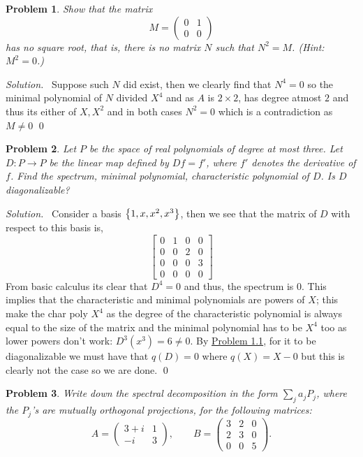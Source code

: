 \documentclass[12pt,a4paper]{article}
\newenvironment{solution}{%
  \par\noindent\textit{Solution.}\ }{\qed}
\theoremstyle{problemstyle}
\newtheorem{problem}{Problem}[section]
\begin{document}
\begin{problem}\label{prob:5-3}
Show that the matrix
\[
  M = \begin{pmatrix} 0 & 1 \\ 0 & 0 \end{pmatrix}
\]
has no square root, that is, there is no matrix $N$ such that $N^2 = M$. (Hint: $M^2 = 0$.)
\end{problem}
\begin{solution}
Suppose such $N$ did exist, then we clearly find that $N^4=0$ so the minimal polynomial of $N$ divided $X^4$ and as $A$ is $2\times 2$, has degree atmost $2$ and thus its either of $X,X^2$ and in both cases $N^2=0$ which is a contradiction as $M\neq 0$
\end{solution}
\begin{problem}\label{prob:5-4}
Let $P$ be the space of real polynomials of degree at most three. Let $D : P \to P$ be the linear map defined by $Df = f'$, where $f'$ denotes the derivative of $f$. Find the spectrum, minimal polynomial, characteristic polynomial of $D$. Is $D$ diagonalizable?
\end{problem}
\begin{solution}
Consider a basis $ \qty{1,x,x^2,x^3}$, then we see that the matrix of $D$ with respect to this basis is,
\[
    \begin{bmatrix}
		0 & 1 & 0 & 0\\
		0 & 0 & 2 & 0\\
		0 & 0 & 0 & 3\\
		0 & 0 & 0 & 0
    \end{bmatrix}
\]
From basic calculus its clear that $D^4=0$ and thus, the spectrum is $ \qty{0}$. 
This implies that the characteristic and minimal polynomials are powers of $X$; this make the char poly $X^4$ as the degree of the characteristic polynomial is always equal to the size of the matrix and the minimal polynomial has to be $X^4$ too as lower powers don't work: $D^3(x^3)=6\neq 0$. 
By \hyperref[prob:5-1]{Problem 1.1}, for it to be diagonalizable we must have that $q(D)=0$ where $q(X)=X-0$ but this is clearly not the case so we are done.
\end{solution}
\begin{problem}\label{prob:5-5}
Write down the spectral decomposition in the form $\sum_j a_j P_j$, where the $P_j$'s are mutually orthogonal projections, for the following matrices:
\[
  A = \begin{pmatrix} 3+i & 1 \\ -i & 3 \end{pmatrix}, \qquad
  B = \begin{pmatrix} 3 & 2 & 0 \\ 2 & 3 & 0 \\ 0 & 0 & 5 \end{pmatrix}.
\]
\end{problem}
\end{document}
